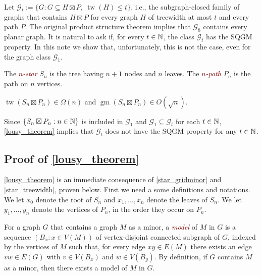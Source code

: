 \documentclass{patmorin}
\newcommand{\defin}[1]{\textcolor{Maroon}{\emph{#1}}}
\DeclareMathOperator{\tw}{tw}
\DeclareMathOperator{\gm}{gm}
\begin{document}

Let $\mathcal{G}_t:=\{G:G\subseteq H\boxtimes P,\ \tw(H)\le t\}$, i.e., the subgraph-closed family of graphs that contains $H\boxtimes P$ for every graph $H$ of treewidth at most $t$ and every path $P$.  The original product structure theorem implies that $\mathcal{G}_8$ contains every planar graph.  It is natural to ask if, for every $t\in\mathbb{N}$, the class $\mathcal{G}_t$ has the SQGM property.  In this note we show that, unfortunately, this is not the case, even for the graph class $\mathcal{G}_1$.

The \defin{$n$-star} $S_n$ is the tree having $n+1$ nodes and $n$ leaves. The \defin{$n$-path} $P_n$ is the path on $n$ vertices.

\begin{thm}\label{lousy_theorem}
  $\tw(S_n\boxtimes P_n)\in \Omega(n)$ and $\gm(S_n\boxtimes P_n)\in O(\sqrt{n})$.
\end{thm}

Since $\{S_n\boxtimes P_n: n\in\mathbb{N}\}$ is included in $\mathcal{G}_1$ and $\mathcal{G}_1\subseteq \mathcal{G}_t$ for each $t\in\mathbb{N}$, \cref{lousy_theorem} implies that $\mathcal{G}_t$ does not have the SQGM property for any $t\in\mathbb{N}$.


\subsection{Proof of \cref{lousy_theorem}}

\cref{lousy_theorem} is an immediate consequence of \cref{star_gridminor} and \cref{star_treewidth}, proven below. First we need a some definitions and notations.  We let $x_0$ denote the root of $S_n$ and $x_1,\ldots,x_n$ denote the leaves of $S_n$.  We let $y_1,\ldots,y_n$ denote the vertices of $P_n$, in the order they occur on $P_n$.

For a graph $G$ that contains a graph $M$ as a minor, a \defin{model} of $M$ in $G$ is a sequence $(B_x:x\in V(M))$ of vertex-disjoint connected subgraph of $G$, indexed by the vertices of $M$ such that, for every edge $xy\in E(M)$ there exists an edge $vw\in E(G)$ with $v\in V(B_x)$ and $w\in V(B_y)$.  By definition, if $G$ contains $M$ as a minor, then there exists a model of $M$ in $G$.
\end{document}
